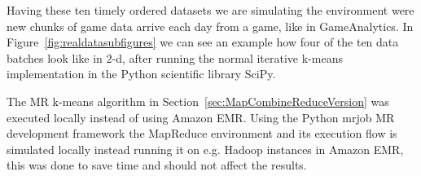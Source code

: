 Having these ten timely ordered datasets we are simulating the environment were new chunks of game data arrive each day from a game, like in GameAnalytics. In Figure~\ref{fig:realdatasubfigures} we can see an example how four of the ten data batches look like in $2$-d, after running the normal iterative k-means implementation in the Python scientific library SciPy.

The MR k-means algorithm in Section~\ref{sec:MapCombineReduceVersion} was executed locally instead of using Amazon EMR. Using the Python mrjob MR development framework the MapReduce environment and its execution flow is simulated locally instead running it on e.g. Hadoop instances in Amazon EMR, this was done to save time and should not affect the results.

\begin{figure}[ht!]
        \begin{center}
\end{center}
\end{figure}
